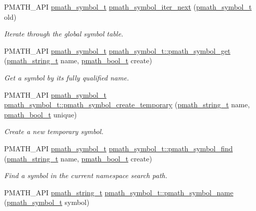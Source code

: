 \begin{CompactItemize}
PMATH\_\-API \hyperlink{classpmath__symbol__t}{pmath\_\-symbol\_\-t} \hyperlink{group__symbols_gaa4869d454bc3a544a5333e58381f760}{pmath\_\-symbol\_\-iter\_\-next} (\hyperlink{classpmath__symbol__t}{pmath\_\-symbol\_\-t} old)
\begin{CompactList}\small\item\em Iterate through the global symbol table. \item\end{CompactList}\item 
PMATH\_\-API \hyperlink{classpmath__symbol__t}{pmath\_\-symbol\_\-t} \hyperlink{group__symbols_g0ccb42b30fcf6ee77d91241222f5c033}{pmath\_\-symbol\_\-t::pmath\_\-symbol\_\-get} (\hyperlink{classpmath__string__t}{pmath\_\-string\_\-t} name, \hyperlink{group__general__types_gc92090cb0b56345d6c379ed2341d4ef4}{pmath\_\-bool\_\-t} create)
\begin{CompactList}\small\item\em Get a symbol by its fully qualified name. \item\end{CompactList}\item 
PMATH\_\-API \hyperlink{classpmath__symbol__t}{pmath\_\-symbol\_\-t} \hyperlink{group__symbols_g6f088bc8c667dfe91087dc4ace6d18c1}{pmath\_\-symbol\_\-t::pmath\_\-symbol\_\-create\_\-temporary} (\hyperlink{classpmath__string__t}{pmath\_\-string\_\-t} name, \hyperlink{group__general__types_gc92090cb0b56345d6c379ed2341d4ef4}{pmath\_\-bool\_\-t} unique)
\begin{CompactList}\small\item\em Create a new temporary symbol. \item\end{CompactList}\item 
PMATH\_\-API \hyperlink{classpmath__symbol__t}{pmath\_\-symbol\_\-t} \hyperlink{group__symbols_g597a971f788584cac3f327f1afdd5f41}{pmath\_\-symbol\_\-t::pmath\_\-symbol\_\-find} (\hyperlink{classpmath__string__t}{pmath\_\-string\_\-t} name, \hyperlink{group__general__types_gc92090cb0b56345d6c379ed2341d4ef4}{pmath\_\-bool\_\-t} create)
\begin{CompactList}\small\item\em Find a symbol in the current namespace search path. \item\end{CompactList}\item 
PMATH\_\-API \hyperlink{classpmath__string__t}{pmath\_\-string\_\-t} \hyperlink{group__symbols_g286ea4e54b4bf2922c519ec5b823bf41}{pmath\_\-symbol\_\-t::pmath\_\-symbol\_\-name} (\hyperlink{classpmath__symbol__t}{pmath\_\-symbol\_\-t} symbol)

\end{CompactItemize}
